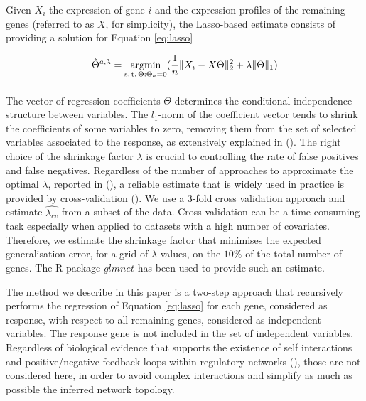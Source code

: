 Given $X_i$ the expression of gene $i$ and the expression profiles of the remaining genes  (referred to as $X$, for simplicity), the Lasso-based estimate consists of providing a solution for Equation \ref{eq:lasso}
  
\begin{equation}
\label{eq:lasso}
    \hat{\Theta}^{a,\lambda} = 
    \argmin_{%
      \substack{%
        \text{s.\,t.}\, \Theta:\Theta_a = 0 \\
        \phantom{}\, 
      }
    }
    (\frac{1}{n} \| X_i - X\Theta \|^{2}_2 + \lambda \| \Theta \|_1)
  \end{equation}
  
The vector of regression coefficients $\Theta$ determines the conditional independence structure between variables. The $l_1$-norm of the coefficient vector tends to shrink the coefficients of some variables to zero, removing them from the set of selected variables associated to the response, as extensively explained in (\citealp{Tibshirani94regressionshrinkage}). 
The right choice of the shrinkage factor $\lambda$ is crucial to controlling the rate of false positives and false negatives. Regardless of the number of approaches to approximate the optimal $\lambda$, reported in (\citealp{adalasso, efron2004, tuneparamsel}), a reliable estimate that is widely used in practice is provided by cross-validation (\citealp{glmnet}). 
We use a 3-fold cross validation approach and estimate $\hat{\lambda_{cv}}$ from a subset of the data. Cross-validation can be a time consuming task especially when applied to datasets with a high number of covariates. Therefore, we estimate the shrinkage factor that minimises the expected generalisation error, for a grid of $\lambda$ values, on the $10\%$ of the total number of genes. The R package $glmnet$ has been used to provide such an estimate.  

The method we describe in this paper is a two-step approach that recursively performs the regression of Equation \ref{eq:lasso} for each gene, considered as response, with respect to all remaining genes, considered as independent variables. The response gene is not included in the set of independent variables. Regardless of biological evidence that supports the existence of self interactions and positive/negative feedback loops within regulatory networks (\citealp{netmotif, avrahamfeedback2011, generegmodel}), those are not considered here, in order to avoid complex interactions and simplify as much as possible the inferred network topology.

